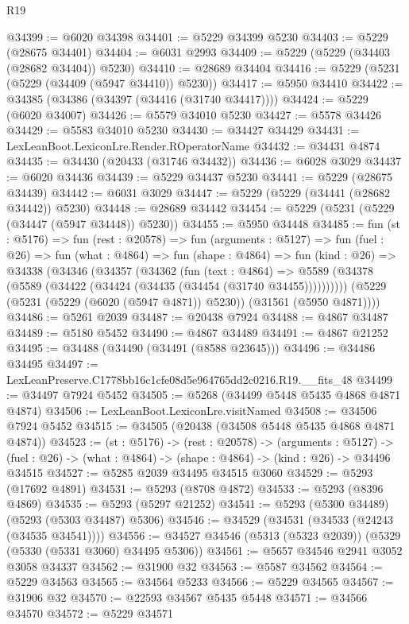 \begin{lexlean}{R19}
\begin{coremodule}
@34399 := @6020 @34398
@34401 := @5229 @34399 @5230
@34403 := @5229 (@28675 @34401)
@34404 := @6031 @2993
@34409 := @5229 (@5229 (@34403 (@28682 @34404)) @5230)
@34410 := @28689 @34404
@34416 := @5229 (@5231 (@5229 (@34409 (@5947 @34410)) @5230))
@34417 := @5950 @34410
@34422 := @34385 (@34386 (@34397 (@34416 (@31740 @34417))))
@34424 := @5229 (@6020 @34007)
@34426 := @5579 @34010 @5230
@34427 := @5578 @34426
@34429 := @5583 @34010 @5230
@34430 := @34427 @34429
@34431 := LexLeanBoot.LexiconLre.Render.ROperatorName
@34432 := @34431 @4874
@34435 := @34430 (@20433 (@31746 @34432))
@34436 := @6028 @3029
@34437 := @6020 @34436
@34439 := @5229 @34437 @5230
@34441 := @5229 (@28675 @34439)
@34442 := @6031 @3029
@34447 := @5229 (@5229 (@34441 (@28682 @34442)) @5230)
@34448 := @28689 @34442
@34454 := @5229 (@5231 (@5229 (@34447 (@5947 @34448)) @5230))
@34455 := @5950 @34448
@34485 := fun (st : @5176) =>
  fun (rest : @20578) =>
  fun (arguments : @5127) =>
  fun (fuel : @26) =>
  fun (what : @4864) =>
  fun (shape : @4864) =>
  fun (kind : @26) =>
  @34338
    (@34346
      (@34357
        (@34362
          (fun (text : @4864) =>
          @5589 (@34378 (@5589 (@34422 (@34424 (@34435 (@34454 (@31740 @34455))))))))))
      (@5229 (@5231 (@5229 (@6020 (@5947 @4871)) @5230)) (@31561 (@5950 @4871))))
@34486 := @5261 @2039
@34487 := @20438 @7924
@34488 := @4867 @34487
@34489 := @5180 @5452
@34490 := @4867 @34489
@34491 := @4867 @21252
@34495 := @34488 (@34490 (@34491 (@8588 @23645)))
@34496 := @34486 @34495
@34497 := LexLeanPreserve.C1778bb16c1cfe08d5e964765dd2c0216.R19.__fits_48
@34499 := @34497 @7924 @5452
@34505 := @5268 (@34499 @5448 @5435 @4868 @4871 @4874)
@34506 := LexLeanBoot.LexiconLre.visitNamed
@34508 := @34506 @7924 @5452
@34515 := @34505 (@20438 (@34508 @5448 @5435 @4868 @4871 @4874))
@34523 := (st : @5176) ->
  (rest : @20578) ->
  (arguments : @5127) ->
  (fuel : @26) -> (what : @4864) -> (shape : @4864) -> (kind : @26) -> @34496 @34515
@34527 := @5285 @2039 @34495 @34515 @3060
@34529 := @5293 (@17692 @4891)
@34531 := @5293 (@8708 @4872)
@34533 := @5293 (@8396 @4869)
@34535 := @5293 (@5297 @21252)
@34541 := @5293 (@5300 @34489) (@5293 (@5303 @34487) @5306)
@34546 := @34529 (@34531 (@34533 (@24243 (@34535 @34541))))
@34556 := @34527 @34546 (@5313 (@5323 @2039)) (@5329 (@5330 (@5331 @3060) @34495 @5306))
@34561 := @5657 @34546 @2941 @3052 @3058 @34337
@34562 := @31900 @32
@34563 := @5587 @34562
@34564 := @5229 @34563
@34565 := @34564 @5233
@34566 := @5229 @34565
@34567 := @31906 @32
@34570 := @22593 @34567 @5435 @5448
@34571 := @34566 @34570
@34572 := @5229 @34571

\end{coremodule}
\end{lexlean}
